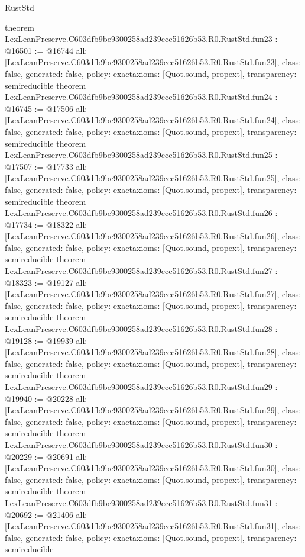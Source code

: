\begin{lexlean}{RustStd}
\begin{coremodule}
{}
theorem LexLeanPreserve.C603dfb9be9300258ad239ccc51626b53.R0.RustStd.fun23 : @16501 := @16744 {
  all: [LexLeanPreserve.C603dfb9be9300258ad239ccc51626b53.R0.RustStd.fun23],
  class: false,
  generated: false,
  policy: exact{axioms: [Quot.sound, propext]},
  transparency: semireducible
}
theorem LexLeanPreserve.C603dfb9be9300258ad239ccc51626b53.R0.RustStd.fun24 : @16745 := @17506 {
  all: [LexLeanPreserve.C603dfb9be9300258ad239ccc51626b53.R0.RustStd.fun24],
  class: false,
  generated: false,
  policy: exact{axioms: [Quot.sound, propext]},
  transparency: semireducible
}
theorem LexLeanPreserve.C603dfb9be9300258ad239ccc51626b53.R0.RustStd.fun25 : @17507 := @17733 {
  all: [LexLeanPreserve.C603dfb9be9300258ad239ccc51626b53.R0.RustStd.fun25],
  class: false,
  generated: false,
  policy: exact{axioms: [Quot.sound, propext]},
  transparency: semireducible
}
theorem LexLeanPreserve.C603dfb9be9300258ad239ccc51626b53.R0.RustStd.fun26 : @17734 := @18322 {
  all: [LexLeanPreserve.C603dfb9be9300258ad239ccc51626b53.R0.RustStd.fun26],
  class: false,
  generated: false,
  policy: exact{axioms: [Quot.sound, propext]},
  transparency: semireducible
}
theorem LexLeanPreserve.C603dfb9be9300258ad239ccc51626b53.R0.RustStd.fun27 : @18323 := @19127 {
  all: [LexLeanPreserve.C603dfb9be9300258ad239ccc51626b53.R0.RustStd.fun27],
  class: false,
  generated: false,
  policy: exact{axioms: [Quot.sound, propext]},
  transparency: semireducible
}
theorem LexLeanPreserve.C603dfb9be9300258ad239ccc51626b53.R0.RustStd.fun28 : @19128 := @19939 {
  all: [LexLeanPreserve.C603dfb9be9300258ad239ccc51626b53.R0.RustStd.fun28],
  class: false,
  generated: false,
  policy: exact{axioms: [Quot.sound, propext]},
  transparency: semireducible
}
theorem LexLeanPreserve.C603dfb9be9300258ad239ccc51626b53.R0.RustStd.fun29 : @19940 := @20228 {
  all: [LexLeanPreserve.C603dfb9be9300258ad239ccc51626b53.R0.RustStd.fun29],
  class: false,
  generated: false,
  policy: exact{axioms: [Quot.sound, propext]},
  transparency: semireducible
}
theorem LexLeanPreserve.C603dfb9be9300258ad239ccc51626b53.R0.RustStd.fun30 : @20229 := @20691 {
  all: [LexLeanPreserve.C603dfb9be9300258ad239ccc51626b53.R0.RustStd.fun30],
  class: false,
  generated: false,
  policy: exact{axioms: [Quot.sound, propext]},
  transparency: semireducible
}
theorem LexLeanPreserve.C603dfb9be9300258ad239ccc51626b53.R0.RustStd.fun31 : @20692 := @21406 {
  all: [LexLeanPreserve.C603dfb9be9300258ad239ccc51626b53.R0.RustStd.fun31],
  class: false,
  generated: false,
  policy: exact{axioms: [Quot.sound, propext]},
  transparency: semireducible
}
\end{coremodule}
\end{lexlean}
